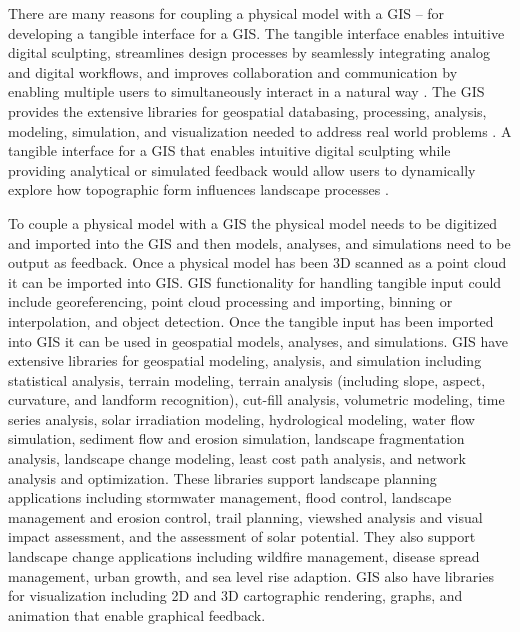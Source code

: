 \documentclass{article}
\begin{document}
There are many reasons for coupling a physical model with a GIS -- for developing a tangible interface for a GIS. 
%
The tangible interface enables intuitive digital sculpting, 
streamlines design processes by seamlessly integrating analog and digital workflows, and 
improves collaboration and communication by enabling multiple users to simultaneously interact 
in a natural way \citep{Ratti2004}. 
%
The GIS provides the extensive libraries for geospatial databasing, processing, analysis, modeling, simulation, and visualization 
needed to address real world problems \citep{Tateosian2010}. 
A tangible interface for a GIS that enables intuitive digital sculpting while providing analytical or simulated feedback would allow users to dynamically explore how topographic form influences landscape processes \citep{Mitasova2006}. 
%

To couple a physical model with a GIS
the physical model needs to be digitized and imported into the GIS
and then models,  analyses, and simulations need to be output as feedback. 
Once a physical model has been 3D scanned as a point cloud it can be imported into GIS. 
GIS functionality for handling tangible input could include 
georeferencing, point cloud processing and importing, binning or interpolation, and object detection. 
Once the tangible input has been imported into GIS
it can be used in geospatial models, analyses, and simulations.  
GIS have extensive libraries for geospatial modeling, analysis, and simulation
including statistical analysis, terrain modeling, terrain analysis (including slope, aspect, curvature, and landform recognition), cut-fill analysis, volumetric modeling, time series analysis, solar irradiation modeling, hydrological modeling, water flow simulation, sediment flow and erosion simulation, landscape fragmentation analysis, landscape change modeling, least cost path analysis, and network analysis and optimization. 
%
These libraries support landscape planning applications including stormwater management, flood control, landscape management and erosion control, trail planning, viewshed analysis and visual impact assessment, and the assessment of solar potential. 
They also support landscape change applications including wildfire management, disease spread management, urban growth, and sea level rise adaption.
%
GIS also have libraries for visualization including 2D and 3D cartographic rendering, graphs, and animation that enable graphical feedback.
\end{document}
